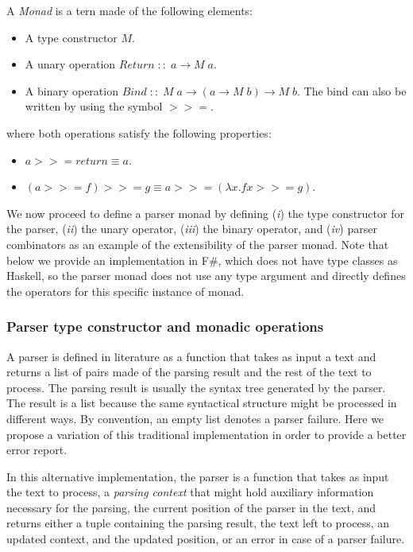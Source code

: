 \begin{definition}
	\label{def:ch_background_monad}
	A \textit{Monad} is a tern made of the following elements:
	\begin{itemize}[noitemsep]
		\item A type constructor $M$.
		\item A unary operation $Return \; :: \; a \rightarrow M \; a$.
		\item A binary operation $Bind \; :: \; M \; a \rightarrow (a \rightarrow M \; b) \rightarrow M \; b$. The bind can also be written by using the symbol $>>=$.
	\end{itemize}
	where both operations satisfy the following properties:
	\begin{itemize}[noitemsep]
		\item $a >>= return \equiv a$.
		\item $(a >>= f) >>= g \equiv a >>= (\lambda x.f x >>= g)$.
	\end{itemize}
\end{definition}
We now proceed to define a parser monad by defining (\textit{i}) the type constructor for the parser, (\textit{ii}) the unary operator, (\textit{iii}) the binary operator, and (\textit{iv}) parser combinators as an example of the extensibility of the parser monad. Note that below we provide an implementation in F\#, which does not have type classes as Haskell, so the parser monad does not use any type argument and directly defines the operators for this specific instance of monad.

\subsubsection{Parser type constructor and monadic operations}

A parser is defined in literature as a function that takes as input a text and returns a list of pairs made of the parsing result and the rest of the text to process. The parsing result is usually the syntax tree generated by the parser. The result is a list because the same syntactical structure might be processed in different ways. By convention, an empty list denotes a parser failure. Here we propose a variation of this traditional implementation in order to provide a better error report.

In this alternative implementation, the parser is a function that takes as input the text to process, a \textit{parsing context} that might hold auxiliary information necessary for the parsing, the current position of the parser in the text, and returns either a tuple containing the parsing result, the text left to process, an updated context, and the updated position, or an error in case of a parser failure.

